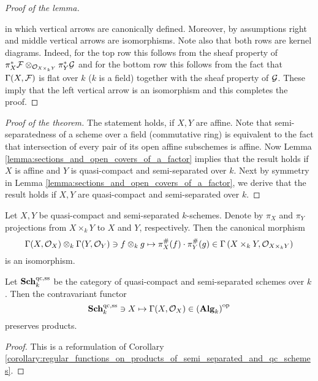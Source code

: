 \begin{proof}[Proof of the lemma]
\begin{center}
\end{center}
\vspace{1cm}
in which vertical arrows are canonically defined. Moreover, by assumptions right and middle vertical arrows are isomorphisms. Note also that both rows are kernel diagrams. Indeed, for the top row this follows from the sheaf property of $\pi^*_X{\mathcal F}\otimes_{{\mathcal O}_{X \times_kY}} \pi^*_Y{\mathcal G}$ and for the bottom row this follows from the fact that $\Gamma(X,{\mathcal F})$ is flat over $k$ ($k$ is a field) together with the sheaf property of ${\mathcal G}$. These imply that the left vertical arrow is an isomorphism and this completes the proof.
\end{proof}

\begin{proof}[Proof of the theorem]
The statement holds, if $X,Y$ are affine. Note that semi-separatedness of a scheme over a field (commutative ring) is equivalent to the fact that intersection of every pair of its open affine subschemes is affine. Now Lemma \ref{lemma:sections_and_open_covers_of_a_factor} implies that the result holds if $X$ is affine and $Y$ is quasi-compact and semi-separated over $k$. Next by symmetry in Lemma \ref{lemma:sections_and_open_covers_of_a_factor}, we derive that the result holds if $X,Y$ are quasi-compact and semi-separated over $k$.
\end{proof}

\begin{corollary}\label{corollary:regular_functions_on_products_of_semi_separated_and_qc_schemes}
Let $X,Y$ be quasi-compact and semi-separated $k$-schemes. Denote by $\pi_X$ and $\pi_Y$ projections from $X\times_kY$ to $X$ and $Y$, respectively. Then the canonical morphism
$$\Gamma(X,{\mathcal O}_X)\otimes_k\Gamma(Y,{\mathcal O}_Y)\ni f\otimes_k g\mapsto \pi_X^{\#}(f)\cdot \pi_Y^{\#}(g)\in \Gamma\left(X\times_kY,{\mathcal O}_{X\times_kY}\right)$$
is an isomorphism.
\end{corollary}

\begin{corollary}\label{corollary:functorial_reformulation_of_regular_functions_on_products_of_semi_separated_and_qc_schemes}
Let $\mathbf{Sch}_k^{\mathrm{qc,ss}}$ be the category of quasi-compact and semi-separated schemes over $k$. Then the contravariant functor
$$\mathbf{Sch}_k^{\mathrm{qc},\mathrm{ss}}\ni X \mapsto \Gamma(X,{\mathcal O}_X)\in \left(\mathbf{Alg}_k\right)^{\mathrm{op}}$$
preserves products.
\end{corollary}
\begin{proof}
This is a reformulation of Corollary \ref{corollary:regular_functions_on_products_of_semi_separated_and_qc_schemes}.
\end{proof}

